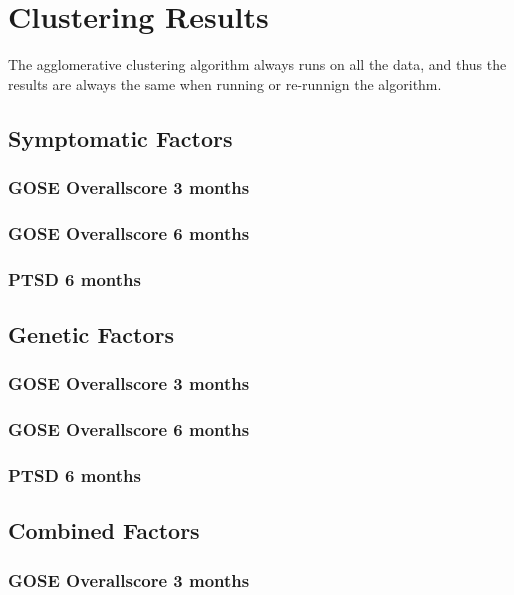\documentclass[11pt]{article}
\begin{document}
\section{Clustering Results}
The agglomerative clustering algorithm always runs on all the data, and thus the results are always the same when running or re-runnign the algorithm.
\subsection{Symptomatic Factors}
\subsubsection{GOSE Overallscore 3 months}
\subsubsection{GOSE Overallscore 6 months}
\subsubsection{PTSD 6 months}

\subsection{Genetic Factors}
\subsubsection{GOSE Overallscore 3 months}
\subsubsection{GOSE Overallscore 6 months}
\subsubsection{PTSD 6 months}

\subsection{Combined Factors}
\subsubsection{GOSE Overallscore 3 months}
\end{document}
